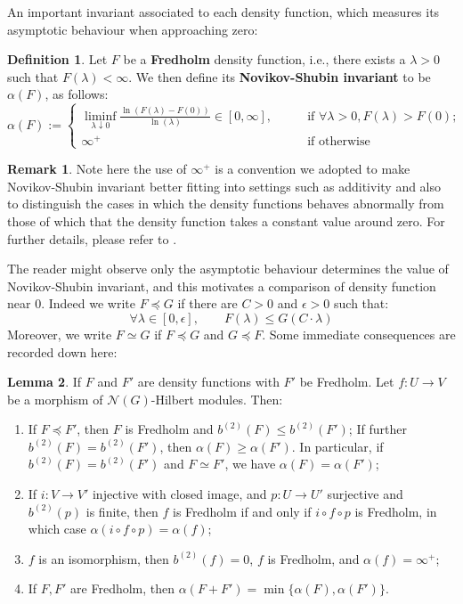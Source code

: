 \documentclass[11pt]{report}
\theoremstyle{definition}
\newtheorem{Def}{Definition}[chapter]
\newtheorem{Lemma}[Def]{Lemma}
\newtheorem{Rmk}{Remark}[chapter]
\theoremstyle{plain}
\newcommand{\vna}{\mathcal{N}}
\begin{document}
\par An important invariant associated to each density function, which measures its asymptotic behaviour when approaching zero:
\begin{Def}\label{2.8}
	Let $F$ be a \textbf{Fredholm} density function, i.e., there exists a $\lambda>0$ such that $F(\lambda)<\infty$. We then define its \textbf{Novikov-Shubin invariant} to be $\alpha(F)$, as follows:
	\begin{equation}
	\alpha(F):=\begin{cases}
	\liminf_{\lambda\downarrow 0}\frac{\ln(F(\lambda)-F(0))}{\ln(\lambda)}\in [0,\infty], \qquad &\text{if } \forall \lambda>0, F(\lambda)>F(0);\\
	\infty^+\qquad &\text{if otherwise}
	\end{cases}
	\end{equation}
\end{Def}
\begin{Rmk}
	Note here the use of $\infty^+$ is a convention we adopted to make Novikov-Shubin invariant better fitting into settings such as additivity and also to distinguish the cases in which the density functions behaves abnormally from those of which that the density function takes a constant value around zero. For further details, please refer to \cite[Notation~2.10]{luck2013}.
\end{Rmk}
The reader might observe only the asymptotic behaviour determines the value of Novikov-Shubin invariant, and this motivates a comparison of density function near $0$. Indeed we write $F\preceq G$ if there are $C>0$ and $\epsilon>0$ such that:
\begin{equation}
\forall \lambda\in [0, \epsilon], \qquad F(\lambda)\leq G(C\cdot \lambda)
\end{equation}
Moreover, we write $F\simeq G$ if $F\preceq G$ and $G\preceq F$. Some immediate consequences are recorded down here:
\begin{Lemma}\label{2.11}
	If $F$ and $F'$ are density functions with $F'$ be Fredholm. Let $f:U\to V$ be a morphism of $\vna(G)$-Hilbert modules. Then:
	\begin{enumerate}
		\item If $F\preceq F'$, then $F$ is Fredholm and $b^{(2)}(F)\leq b^{(2)}(F')$; If further $b^{(2)}(F)=b^{(2)}(F')$, then $\alpha(F)\geq \alpha(F')$. In particular, if $b^{(2)}(F)=b^{(2)}(F')$ and $F\simeq F'$, we have $\alpha(F)=\alpha(F')$;
		\item If $i:V\to V'$  injective with closed image, and $p:U\to U'$ surjective and $b^{(2)}(p)$ is finite, then $f$ is Fredholm if and only if $i\circ f\circ p$ is Fredholm, in which case $\alpha(i\circ f\circ p)=\alpha(f)$;
		\item $f$ is an isomorphism, then $b^{(2)}(f)=0$, $f$ is Fredholm, and $\alpha(f)=\infty^+$;
		\item If $F, F'$ are Fredholm, then $\alpha(F+F')=\min\{\alpha(F), \alpha(F')\}$.
	\end{enumerate} 
\end{Lemma}
\end{document}
